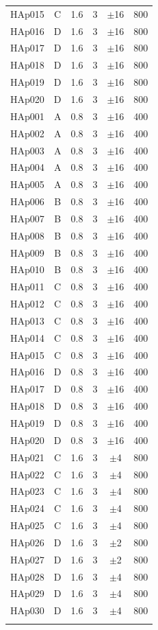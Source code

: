 {\begin{longtable}{lccccc}
	HAp015 & C & 1.6 & 3 & $\pm$16 & 800\\
	HAp016 & D & 1.6 & 3 & $\pm$16 & 800\\
	HAp017 & D & 1.6 & 3 & $\pm$16 & 800\\
	HAp018 & D & 1.6 & 3 & $\pm$16 & 800\\
	HAp019 & D & 1.6 & 3 & $\pm$16 & 800\\
	HAp020 & D & 1.6 & 3 & $\pm$16 & 800\\
	HAp001 & A & 0.8 & 3 & $\pm$16 & 400\\
	HAp002 & A & 0.8 & 3 & $\pm$16 & 400\\
	HAp003 & A & 0.8 & 3 & $\pm$16 & 400\\
	HAp004 & A & 0.8 & 3 & $\pm$16 & 400\\
	HAp005 & A & 0.8 & 3 & $\pm$16 & 400\\
	HAp006 & B & 0.8 & 3 & $\pm$16 & 400\\
	HAp007 & B & 0.8 & 3 & $\pm$16 & 400\\
	HAp008 & B & 0.8 & 3 & $\pm$16 & 400\\
	HAp009 & B & 0.8 & 3 & $\pm$16 & 400\\
	HAp010 & B & 0.8 & 3 & $\pm$16 & 400\\
	HAp011 & C & 0.8 & 3 & $\pm$16 & 400\\
	HAp012 & C & 0.8 & 3 & $\pm$16 & 400\\
	HAp013 & C & 0.8 & 3 & $\pm$16 & 400\\
	HAp014 & C & 0.8 & 3 & $\pm$16 & 400\\
	HAp015 & C & 0.8 & 3 & $\pm$16 & 400\\
	HAp016 & D & 0.8 & 3 & $\pm$16 & 400\\
	HAp017 & D & 0.8 & 3 & $\pm$16 & 400\\
	HAp018 & D & 0.8 & 3 & $\pm$16 & 400\\
	HAp019 & D & 0.8 & 3 & $\pm$16 & 400\\
	HAp020 & D & 0.8 & 3 & $\pm$16 & 400\\
	HAp021 & C & 1.6 & 3 & $\pm$4 & 800\\
	HAp022 & C & 1.6 & 3 & $\pm$4 & 800\\
	HAp023 & C & 1.6 & 3 & $\pm$4 & 800\\
	HAp024 & C & 1.6 & 3 & $\pm$4 & 800\\
	HAp025 & C & 1.6 & 3 & $\pm$4 & 800\\
	HAp026 & D & 1.6 & 3 & $\pm$2 & 800\\
	HAp027 & D & 1.6 & 3 & $\pm$2 & 800\\
	HAp028 & D & 1.6 & 3 & $\pm$4 & 800\\
	HAp029 & D & 1.6 & 3 & $\pm$4 & 800\\
	HAp030 & D & 1.6 & 3 & $\pm$4 & 800\\
\bottomrule
\label{tab:hap_tests}
\end{longtable}
}

